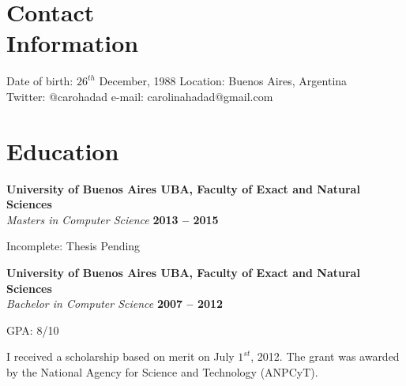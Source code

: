 \documentclass[margin,line]{resume}
\begin{document}
\begin{resume}

\section{\mysidestyle Contact\\Information}

Date of birth: $26^{th}$ December, 1988  \hfill Location: Buenos Aires, Argentina\\ \vspace{0.5mm}
\hspace{-2.2mm} Twitter: @carohadad \hfill e-mail: carolinahadad@gmail.com\\ \vspace{0.5mm}

\section{\mysidestyle Education}

\textbf{University of Buenos Aires UBA, Faculty of Exact and Natural Sciences} \vspace{2mm}\\\vspace{1mm}
\textsl{Masters in Computer Science} \hfill \textbf{2013 -- 2015}\vspace{-3mm}\\\vspace{-1mm}
\begin{list2}
	\item Incomplete: Thesis Pending
\end{list2}

\textbf{University of Buenos Aires UBA, Faculty of Exact and Natural Sciences} \vspace{2mm}\\\vspace{1mm}
\textsl{Bachelor in Computer Science} \hfill \textbf{2007 -- 2012}\vspace{-3mm}\\\vspace{-1mm}
\begin{list2}
	\item GPA: 8/10
	\item I received a scholarship based on merit on July $1^{st}$, 2012. The grant was awarded by the National Agency for Science and Technology (ANPCyT).
\end{list2}
    

\end{resume}
\end{document}
